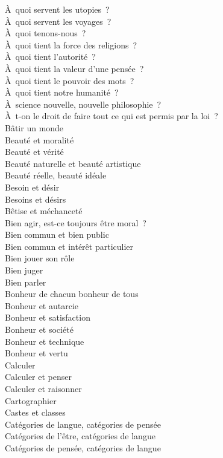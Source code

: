 \documentclass[a4paper,12pt]{article}
\begin{document}
À quoi servent les utopies ? \\
À quoi servent les voyages ? \\
À quoi tenons-nous ? \\
À quoi tient la force des religions ? \\
À quoi tient l'autorité ? \\
À quoi tient la valeur d'une pensée ? \\
À quoi tient le pouvoir des mots ? \\
À quoi tient notre humanité ? \\
À science nouvelle, nouvelle philosophie ? \\
À t-on le droit de faire tout ce qui est permis par la loi ? \\
Bâtir un monde \\
Beauté et moralité \\
Beauté et vérité \\
Beauté naturelle et beauté artistique \\
Beauté réelle, beauté idéale \\
Besoin et désir \\
Besoins et désirs \\
Bêtise et méchanceté \\
Bien agir, est-ce toujours être moral ? \\
Bien commun et bien public \\
Bien commun et intérêt particulier \\
Bien jouer son rôle \\
Bien juger \\
Bien parler \\
Bonheur de chacun bonheur de tous \\
Bonheur et autarcie \\
Bonheur et satisfaction \\
Bonheur et société \\
Bonheur et technique \\
Bonheur et vertu \\
Calculer \\
Calculer et penser \\
Calculer et raisonner \\
Cartographier \\
Castes et classes \\
Catégories de langue, catégories de pensée \\
Catégories de l'être, catégories de langue \\
Catégories de pensée, catégories de langue \\
\end{document}
